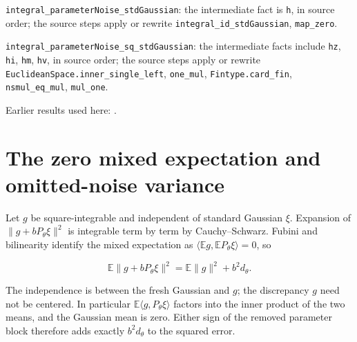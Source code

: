 \documentclass[11pt,a4paper]{article}
\begin{document}
\begin{leanbox}
\texttt{integral\_\allowbreak{}parameter\allowbreak{}Noise\_\allowbreak{}std\allowbreak{}Gaussian}: the intermediate fact is \texttt{h}, in source order; the source steps apply or rewrite \texttt{integral\_\allowbreak{}id\_\allowbreak{}std\allowbreak{}Gaussian}, \texttt{map\_\allowbreak{}zero}.



\texttt{integral\_\allowbreak{}parameter\allowbreak{}Noise\_\allowbreak{}sq\_\allowbreak{}std\allowbreak{}Gaussian}: the intermediate facts include \texttt{hz}, \texttt{hi}, \texttt{hm}, \texttt{hv}, in source order; the source steps apply or rewrite \texttt{Euclidean\allowbreak{}Space.\allowbreak{}inner\_\allowbreak{}single\_\allowbreak{}left}, \texttt{one\_\allowbreak{}mul}, \texttt{Fintype.\allowbreak{}card\_\allowbreak{}fin}, \texttt{nsmul\_\allowbreak{}eq\_\allowbreak{}mul}, \texttt{mul\_\allowbreak{}one}.
\end{leanbox}


Earlier results used here: \cite[Section~3.1.1]{LangevinLean2026IPLA}.

\section{\texorpdfstring{The zero mixed expectation and omitted-noise variance}{The zero mixed expectation and omitted-noise variance}}


Let \(g\) be square-integrable and independent of standard Gaussian \(\xi\). Expansion of \(\|g+bP_\theta\xi\|^2\) is integrable term by term by Cauchy–Schwarz. Fubini and bilinearity identify the mixed expectation as \(\langle\mathbb E g,\mathbb E P_\theta\xi\rangle=0\), so

\[\mathbb E\|g+bP_\theta\xi\|^2=\mathbb E\|g\|^2+b^2d_\theta.\]

The independence is between the fresh Gaussian and \(g\); the discrepancy \(g\) need not be centered. In particular \(\mathbb E\langle g,P_\theta\xi\rangle\) factors into the inner product of the two means, and the Gaussian mean is zero. Either sign of the removed parameter block therefore adds exactly \(b^2d_\theta\) to the squared error.
\end{document}
